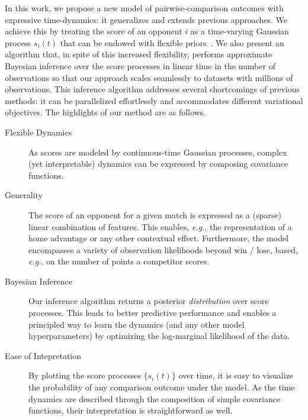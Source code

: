 In this work, we propose a new model of pairwise-comparison outcomes with expressive time-dynamics: it generalizes and extends previous approaches.
We achieve this by treating the score of an opponent $i$ as a time-varying Gaussian process $s_i(t)$ that can be endowed with flexible priors~\citep{rasmussen2006gaussian}.
We also present an algorithm that, in spite of this increased flexibility, performs approximate Bayesian inference over the score processes in linear time in the number of observations so that our approach scales seamlessly to datasets with millions of observations.
This inference algorithm addresses several shortcomings of previous methods: it can be parallelized effortlessly and accommodates different variational objectives.
The highlights of our method are as follows.

\begin{description}
	\item[Flexible Dynamics]
	      As scores are modeled by continuous-time Gaussian processes, complex (yet interpretable) dynamics can be expressed by composing covariance functions.

	\item[Generality]
	      The score of an opponent for a given match is expressed as a (sparse) linear combination of features.
	      This enables, \textit{e.g.}, the representation of a home advantage or any other contextual effect.
	      Furthermore, the model encompasses a variety of observation likelihoods beyond win / lose, based, \textit{e.g.}, on the number of points a competitor scores.

	\item[Bayesian Inference]
	      Our inference algorithm returns a posterior \emph{distribution} over score processes.
	      This leads to better predictive performance and enables a principled way to learn the dynamics (and any other model hyperparameters) by optimizing the log-marginal likelihood of the data.

	\item[Ease of Intepretation]
	      By plotting the score processes $\{ s_i(t) \}$ over time, it is easy to visualize the probability of any comparison outcome under the model.
	      As the time dynamics are described through the composition of simple covariance functions, their interpretation is straightforward as well.
\end{description}

